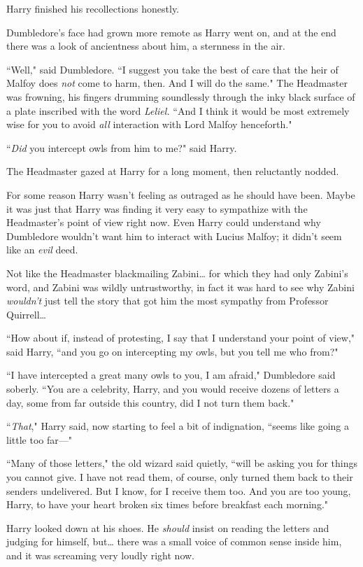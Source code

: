 Harry finished his recollections honestly.

Dumbledore's face had grown more remote as Harry went on, and at the end there was a look of ancientness about him, a sternness in the air.

``Well," said Dumbledore. ``I suggest you take the best of care that the heir of Malfoy does \emph{not} come to harm, then. And I will do the same." The Headmaster was frowning, his fingers drumming soundlessly through the inky black surface of a plate inscribed with the word \emph{Leliel.} ``And I think it would be most extremely wise for you to avoid \emph{all} interaction with Lord Malfoy henceforth."

``\emph{Did} you intercept owls from him to me?" said Harry.

The Headmaster gazed at Harry for a long moment, then reluctantly nodded.

For some reason Harry wasn't feeling as outraged as he should have been. Maybe it was just that Harry was finding it very easy to sympathize with the Headmaster's point of view right now. Even Harry could understand why Dumbledore wouldn't want him to interact with Lucius Malfoy; it didn't seem like an \emph{evil} deed.

Not like the Headmaster blackmailing Zabini{\ldots} for which they had only Zabini's word, and Zabini was wildly untrustworthy, in fact it was hard to see why Zabini \emph{wouldn't} just tell the story that got him the most sympathy from Professor Quirrell{\ldots}

``How about if, instead of protesting, I say that I understand your point of view," said Harry, ``and you go on intercepting my owls, but you tell me who from?"

``I have intercepted a great many owls to you, I am afraid," Dumbledore said soberly. ``You are a celebrity, Harry, and you would receive dozens of letters a day, some from far outside this country, did I not turn them back."

``\emph{That}," Harry said, now starting to feel a bit of indignation, ``seems like going a little too far—"

``Many of those letters," the old wizard said quietly, ``will be asking you for things you cannot give. I have not read them, of course, only turned them back to their senders undelivered. But I know, for I receive them too. And you are too young, Harry, to have your heart broken six times before breakfast each morning."

Harry looked down at his shoes. He \emph{should} insist on reading the letters and judging for himself, but{\ldots} there was a small voice of common sense inside him, and it was screaming very loudly right now.


